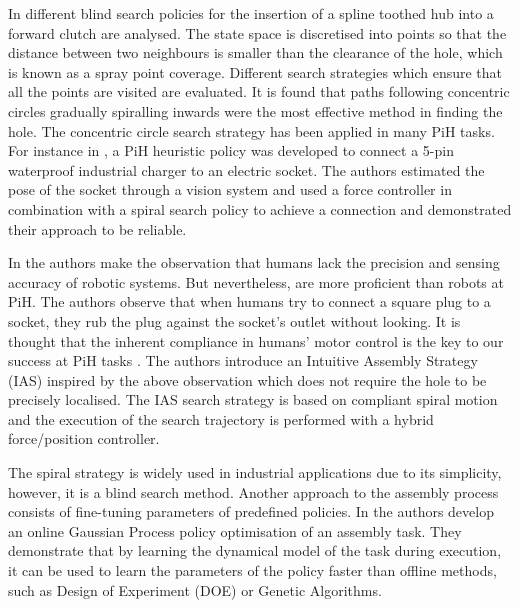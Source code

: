 In \cite{search_strategies_icra_2001} different blind search policies for the insertion of a spline toothed hub 
into a forward clutch are analysed. The state space is discretised into points so that the distance between two 
neighbours is smaller than the clearance of the hole, which is known as a spray point coverage. Different search 
strategies which ensure that all the points are visited are evaluated. It is found that paths following  
concentric circles gradually spiralling inwards were the most effective method in finding the hole. The concentric circle
search strategy has been applied in many PiH tasks. For instance in \cite{peg_imcssd_2015}, a PiH heuristic 
policy was developed to connect a 5-pin waterproof industrial charger to an electric socket. The authors 
estimated the pose of the socket through a vision system and used a force controller in combination with a 
spiral search policy to achieve a connection and demonstrated their approach to be reliable. 

In \cite{intuitive_peg_isr_2013} the authors make the observation that humans lack the precision and sensing 
accuracy of robotic systems. But nevertheless, are more proficient than robots at PiH. The authors observe that when humans try to connect a square plug to a socket, they rub the plug against the socket's 
outlet without looking. It is thought that the inherent compliance in humans' motor control  
is the key to our success at PiH tasks \cite{compliant_manip_icra_2008}. 
The authors introduce an Intuitive Assembly Strategy (IAS) inspired by the above observation which 
does not require the hole to be precisely localised. The IAS search strategy is based on compliant 
spiral motion and the execution of the search trajectory is performed with a hybrid force/position controller.

The spiral strategy is widely used in industrial applications due to its simplicity, 
however, it is a blind search method. Another approach to the assembly process 
consists of fine-tuning parameters of predefined policies. In \cite{online_gpr_icra_2014}
the authors develop an online Gaussian Process policy optimisation of an assembly task. They 
demonstrate that by learning the dynamical model of the task during execution, it can be used to 
learn the parameters of the policy faster than offline methods, such as Design of Experiment (DOE) 
or Genetic Algorithms.

